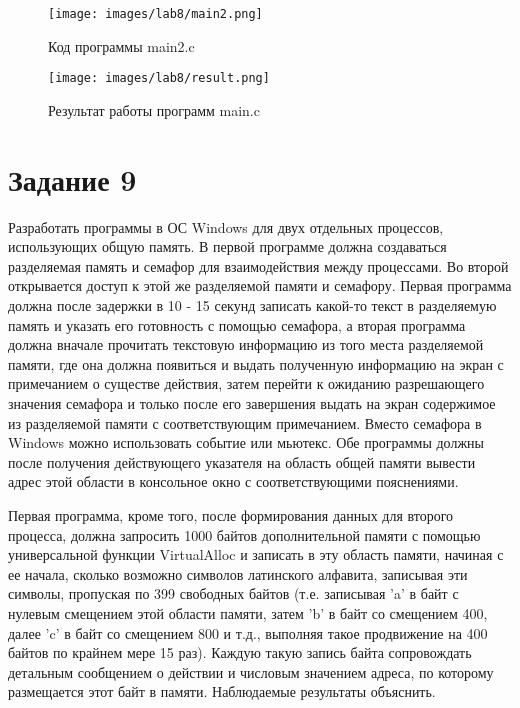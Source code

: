 \documentclass[14pt, a4paper]{article}
\begin{document}
    \begin{figure}[H]
        \centering
        \texttt{[image: images/lab8/main2.png]}
        \caption{Код программы main2.c}
    \end{figure}

    \begin{figure}[H]
        \centering
        \texttt{[image: images/lab8/result.png]}
        \caption{Результат работы программ main.c}
    \end{figure}

    \newpage

    \section*{Задание 9}

    Разработать программы в ОС Windows для двух отдельных процессов, использующих общую память. В первой программе должна создаваться разделяемая память и семафор для взаимодействия между процессами. Во второй открывается доступ к этой же разделяемой памяти и семафору. Первая программа должна после задержки в 10 - 15 секунд записать какой-то текст в разделяемую память и указать его готовность с помощью семафора, а вторая программа должна вначале прочитать текстовую информацию из того места разделяемой памяти, где она должна появиться и выдать полученную информацию на экран с примечанием о существе действия, затем перейти к ожиданию разрешающего значения семафора и только после его завершения выдать на экран содержимое из разделяемой памяти с соответствующим примечанием. Вместо семафора в Windows можно использовать событие или мьютекс. Обе программы должны после получения действующего указателя на область общей памяти вывести адрес этой области в консольное окно с соответствующими пояснениями.

    Первая программа, кроме того, после формирования данных для второго процесса, должна запросить 1000 байтов дополнительной памяти с помощью универсальной функции VirtualAlloc и записать в эту область памяти, начиная с ее начала, сколько возможно символов латинского алфавита, записывая эти символы, пропуская по 399 свободных байтов (т.е. записывая 'a' в байт с нулевым смещением этой области памяти, затем 'b' в байт со смещением 400, далее 'c' в байт со смещением 800 и т.д., выполняя такое продвижение на 400 байтов по крайнем мере 15 раз). Каждую такую запись байта сопровождать детальным сообщением о действии и числовым значением адреса, по которому размещается этот байт в памяти. Наблюдаемые результаты объяснить.
\end{document}

